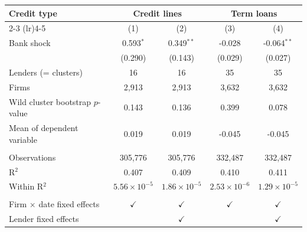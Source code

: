 
\begingroup
\centering
\small
\begin{tabular}{lcccc}
   \toprule
   Credit type & \multicolumn{2}{c}{Credit lines} & \multicolumn{2}{c}{Term loans} \\ 
   \cmidrule(lr){2-3} \cmidrule(lr){4-5}
                                     & (1)                   & (2)                   & (3)                   & (4)\\  
   \midrule 
   Bank shock                        & 0.593$^{*}$           & 0.349$^{**}$          & -0.028                & -0.064$^{**}$\\   
                                     & (0.290)               & (0.143)               & (0.029)               & (0.027)\\   
   Lenders (= clusters)              & 16                    & 16                    & 35                    & 35\\  
   Firms                             & 2,913                 & 2,913                 & 3,632                 & 3,632\\  
   Wild cluster bootstrap $p$-value  & 0.143                 & 0.136                 & 0.399                 & 0.078\\  
   Mean of dependent variable        & 0.019                 & 0.019                 & -0.045                & -0.045\\  
    \\
   Observations                      & 305,776               & 305,776               & 332,487               & 332,487\\  
   R$^2$                             & 0.407                 & 0.409                 & 0.410                 & 0.411\\  
   Within R$^2$                      & $5.56\times 10^{-5}$  & $1.86\times 10^{-5}$  & $2.53\times 10^{-6}$  & $1.29\times 10^{-5}$\\   
    \\
   Firm $\times$ date fixed effects  & $\checkmark$          & $\checkmark$          & $\checkmark$          & $\checkmark$\\   
   Lender fixed effects              &                       & $\checkmark$          &                       & $\checkmark$\\   
   \bottomrule
\end{tabular}
\par\endgroup


